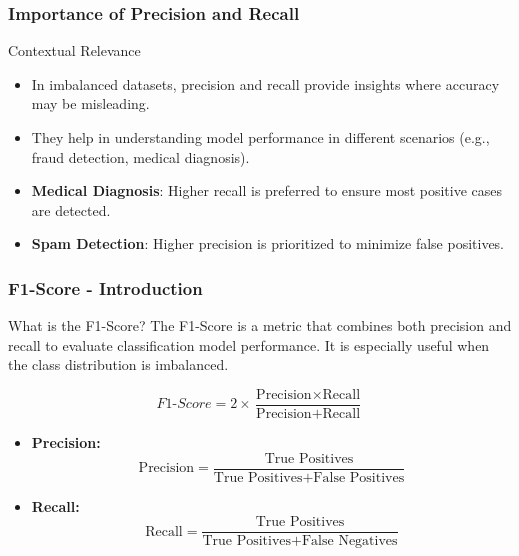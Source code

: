 \documentclass[aspectratio=169]{beamer}
\begin{document}
\begin{frame}[fragile]
    \frametitle{Importance of Precision and Recall}
    \begin{block}{Contextual Relevance}
        \begin{itemize}
            \item In imbalanced datasets, precision and recall provide insights where accuracy may be misleading.
            \item They help in understanding model performance in different scenarios (e.g., fraud detection, medical diagnosis).
        \end{itemize}
    \end{block}

    \begin{itemize}
        \item \textbf{Medical Diagnosis}: Higher recall is preferred to ensure most positive cases are detected.
        \item \textbf{Spam Detection}: Higher precision is prioritized to minimize false positives.
    \end{itemize}
\end{frame}

\begin{frame}[fragile]
    \frametitle{F1-Score - Introduction}
    \begin{block}{What is the F1-Score?}
        The F1-Score is a metric that combines both precision and recall to evaluate classification model performance. It is especially useful when the class distribution is imbalanced.
    \end{block}
    \begin{equation}
        F1\text{-}Score = 2 \times \frac{\text{Precision} \times \text{Recall}}{\text{Precision} + \text{Recall}}
    \end{equation}
    \begin{itemize}
        \item \textbf{Precision:} 
        \[
        \text{Precision} = \frac{\text{True Positives}}{\text{True Positives} + \text{False Positives}}
        \]
        \item \textbf{Recall:} 
        \[
        \text{Recall} = \frac{\text{True Positives}}{\text{True Positives} + \text{False Negatives}}
        \]
    \end{itemize}
\end{frame}
\end{document}
